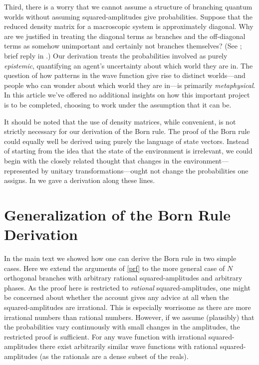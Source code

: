 \documentclass[onecolumn,secnumarabic,amsmath,amssymb,balancelastpage,nofootinbib]{article}
\begin{document}
Third, there is a worry that we cannot assume a structure of branching quantum worlds without assuming squared-amplitudes give probabilities.  Suppose that the reduced density matrix for a macroscopic system is approximately diagonal.  Why are we justified in treating the diagonal terms as branches and the off-diagonal terms as somehow unimportant and certainly not branches themselves?  (See \citealp{baker2007}; brief reply in \citealp[pp. 243-254]{wallace2012}.)  Our derivation treats the probabilities involved as purely \emph{epistemic}, quantifying an agent's uncertainty about which world they are in.  The question of how patterns in the wave function give rise to distinct worlds---and people who can wonder about which world they are in---is primarily \emph{metaphysical}.  In this article we've offered no additional insights on how this important project is to be completed, choosing to work under the assumption that it can be.

It should be noted that the use of density matrices, while convenient, is not strictly necessary for our derivation of the Born rule.  The proof of the Born rule could equally well be derived using purely the language of state vectors.  Instead of starting from the idea that the state of the environment is irrelevant, we could begin with the closely related thought that changes in the environment---represented by unitary transformations---ought not change the probabilities one assigns. In \citet{carroll2013} we gave a derivation along these lines.

\section{Generalization of the Born Rule Derivation}\label{generalization}

In the main text we showed how one can derive the Born rule in two simple cases.  Here we extend the arguments of \textsection \ref{prf} to the more general case of $N$ orthogonal branches with arbitrary rational squared-amplitudes and arbitrary phases.  As the proof here is restricted to \emph{rational} squared-amplitudes, one might be concerned about whether the account gives any advice at all when the squared-amplitudes are irrational.  This is especially worrisome as there are more irrational numbers than rational numbers.  However, if we assume (plausibly) that the probabilities vary continuously with small changes in the amplitudes, the restricted proof is sufficient. For any wave function with irrational squared-amplitudes there exist arbitrarily similar wave functions with rational squared-amplitudes (as the rationals are a dense subset of the reals).
\end{document}
